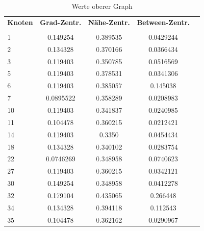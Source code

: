\begin{table}[h!]
\footnotesize
\caption{Werte oberer Graph}
\begin{tabular}{lcccc}\toprule 
\textbf{Knoten} &\textbf{Grad-Zentr.} &\textbf{Nähe-Zentr.}  &\textbf{Between-Zentr.} \\
 &\\\midrule
  1 & 0.149254  & 0.389535 & 0.0429244   \\
  2 & 0.134328  & 0.370166 & 0.0366434   \\
  3 & 0.119403  & 0.350785 & 0.0516569   \\
  5 & 0.119403  & 0.378531 & 0.0341306   \\
  6 & 0.119403  & 0.385057 & 0.145038    \\
  7 & 0.0895522 & 0.358289 & 0.0208983   \\
 10 & 0.119403  & 0.341837 & 0.0240985   \\
 11 & 0.104478  & 0.360215 & 0.0212421   \\
 14 & 0.119403  & 0.3350    & 0.0454434   \\
 18 & 0.134328  & 0.340102 & 0.0283754   \\
 22 & 0.0746269 & 0.348958 & 0.0740623   \\
 27 & 0.119403  & 0.360215 & 0.0342121   \\
 30 & 0.149254  & 0.348958 & 0.0412278   \\
 32 & 0.179104  & 0.435065 & 0.266448    \\
 34 & 0.134328  & 0.394118 & 0.112543    \\
 35 & 0.104478  & 0.362162 & 0.0290967   \\
       

\end{tabular}
\end{table}
